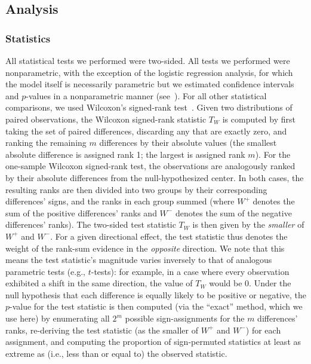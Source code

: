 \documentclass[10pt]{article}
\renewcommand{\nameref}[1]{\textit{\oldnameref{#1}}}
\begin{document}
\subsection*{Analysis}

\subsubsection*{Statistics}\label{subsec:stats}

All statistical tests we performed were two-sided. All tests we performed were nonparametric, with the exception of the logistic regression analysis, for which the model itself is necessarily parametric but we estimated confidence intervals and $p$-values in a nonparametric manner (see~\nameref{subsec:rdp}).
For all other statistical comparisons, we used Wilcoxon's signed-rank test~\citep{Wilc45}.
Given two distributions of paired observations, the Wilcoxon signed-rank statistic $T_W$ is computed by first taking the set of paired differences, discarding any that are exactly zero, and ranking the remaining $m$ differences by their absolute values (the smallest absolute difference is assigned rank 1; the largest is assigned rank $m$). 
For the one-sample Wilcoxon signed-rank test, the observations are analogously ranked by their absolute differences from the null-hypothesized center.
In both cases, the resulting ranks are then divided into two groups by their corresponding differences' signs, and the ranks in each group summed (where $W^+$ denotes the sum of the positive differences' ranks and $W^-$ denotes the sum of the negative differences' ranks).
The two-sided test statistic $T_W$ is then given by the \textit{smaller} of $W^+$ and $W^-$.
For a given directional effect, the test statistic thus denotes the weight of the rank-sum evidence in the \textit{opposite} direction.
We note that this means the test statistic's magnitude varies inversely to that of analogous parametric tests (e.g., $t$-tests): for example, in a case where every observation exhibited a shift in the same direction, the value of $T_W$ would be 0.
Under the null hypothesis that each difference is equally likely to be positive or negative, the $p$-value for the test statistic is then computed (via the ``exact'' method, which we use here) by enumerating all $2^m$ possible sign-assignments for the $m$ differences' ranks, re-deriving the test statistic (as the smaller of $W^+$ and $W^-$) for each assignment, and computing the proportion of sign-permuted statistics at least as extreme as (i.e., less than or equal to) the observed statistic.
\end{document}

